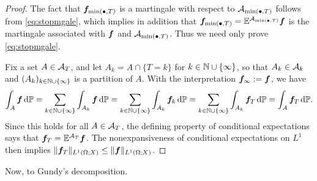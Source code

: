 \begin{proof}
  The fact that $\bm{f}_{\min(\bullet,T)}$ is a martingale with respect to $\mathcal{A}_{\min(\bullet,T)}$ follows from \eqref{eq:stopmgale}, which implies in addition that $\bm{f}_{\min(\bullet,T)} = \mathbb{E}^{\mathcal{A}_{\min(\bullet,T)}} \bm{f}$ is the martingale associated with $\bm{f}$ and $\mathcal{A}_{\min(\bullet,T)}$.
  Thus we need only prove \eqref{eq:stopmgale}.
  
  Fix a set $A \in \mathcal{A}_{T}$, and let $A_{k} = A \cap \{T = k\}$ for $k \in \mathbb{N} \cup \{\infty\}$, so that $A_{k} \in \mathcal{A}_{k}$ and $(A_{k})_{k \in \mathbb{N} \cup \{\infty\}}$ is a partition of $A$.
  With the interpretation $\bm{f}_{\infty} := \bm{f}$, we have
  \begin{equation*}
      \int_{A} \bm{f} \, \mathrm{d} \mathbb{P} 
      = \sum_{k \in \mathbb{N} \cup \{\infty\}} \int_{A_k} \bm{f} \, \mathrm{d} \mathbb{P} 
      = \sum_{k \in \mathbb{N} \cup \{\infty\}} \int_{A_{k}} \bm{f}_{k} \, \mathrm{d} \mathbb{P} 
      = \sum_{k \in \mathbb{N} \cup \{\infty\}} \int_{A_{k}} \bm{f}_{T} \, \mathrm{d} \mathbb{P} 
      = \int_{A} \bm{f}_{T} \, \mathrm{d} \mathbb{P}.
  \end{equation*}
  Since this holds for all $A \in \mathcal{A}_{T}$, the defining property of conditional expectations says that $\bm{f}_{T} = \mathbb{E}^{\mathcal{A}_{T}} \bm{f}$.
  The nonexpansiveness of conditional expectations on $L^1$ then implies $\|\bm{f}_{T}\|_{L^1(\Omega;X)} \leq \|\bm{f}\|_{L^1(\Omega;X)}$.
\end{proof}

Now, to Gundy's decomposition.

